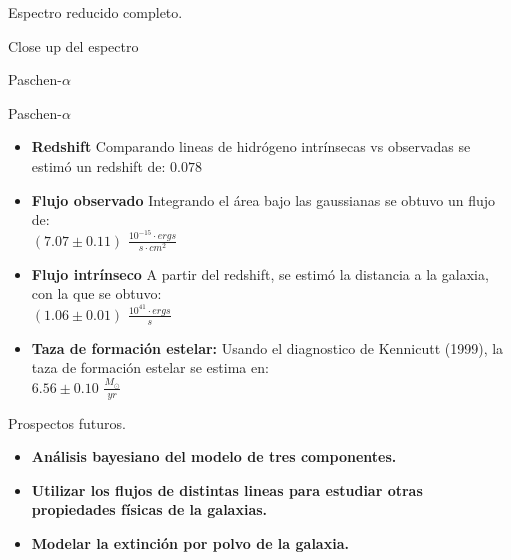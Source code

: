 \documentclass[
	spanish, %
	aspectratio=43, %
	hyperref={pdfencoding=auto,psdextra},
	xcolor={dvipsnames,table,usenames}
]{beamer}
\begin{document}
\begin{frame}{Espectro reducido completo.}
	 \end{frame}


\begin{frame}{Close up del espectro}
	 \end{frame}


\begin{frame}{Paschen-$\alpha$}
	 \end{frame}


\begin{frame}{Paschen-$\alpha$}
	
	\begin{itemize}
	\item{\textbf{Redshift}}
	Comparando lineas de hidrógeno intrínsecas vs observadas se estimó un redshift de: $0.078$
	\item{\textbf{Flujo observado}}
		Integrando el área bajo las gaussianas se obtuvo un flujo de:\\ $(7.07 \pm 0.11)$ $\frac{10^{-15} \cdot ergs}{s \cdot cm^2}$

	
	\item{\textbf{Flujo intrínseco}}
		A partir del redshift, se estimó la distancia a la galaxia, con la que se obtuvo:\\ $(1.06 \pm 0.01)$ $\frac{10^{41} \cdot ergs}{s}$
		

	
	
	\item{\textbf{Taza de formación estelar:}}
		Usando el diagnostico de Kennicutt (1999), la taza de formación estelar se estima en:\\
		$6.56 \pm 0.10$ $\frac{M_{\odot}}{yr}$
	\end{itemize}
\end{frame}

\begin{frame}{Prospectos futuros.}
	
	\begin{itemize}
	\item{\textbf{Análisis bayesiano del modelo de tres componentes.}}

	\item{\textbf{Utilizar los flujos de distintas lineas para estudiar otras propiedades físicas de la galaxias.}}
	
	
	\item{\textbf{Modelar la extinción por polvo de la galaxia.}}

\end{itemize}

\end{frame}
\end{document}
